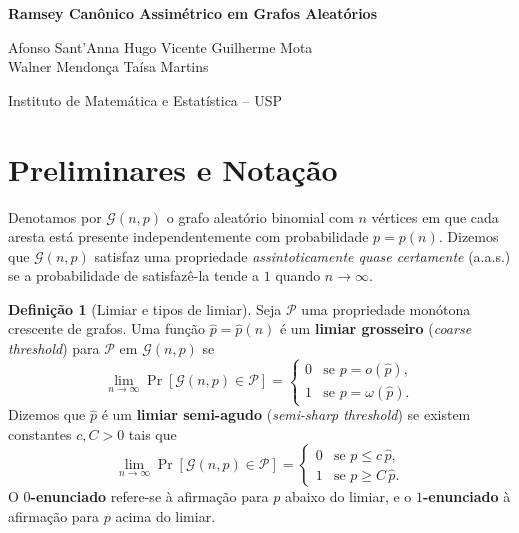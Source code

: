 \documentclass[reqno, 12pt]{amsart}
\date{\today}
\numberwithin{equation}{section}
\theoremstyle{plain}
\theoremstyle{definition}
\newtheorem{definition}[theorem]{Definição}
\newcommand{\Gnp}{\mathcal{G}(n,p)}
\newcommand{\whp}{a.a.s.}
\begin{document}

\begin{center}
  {\large\textbf{Ramsey Canônico Assimétrico em Grafos Aleatórios}}

  \vspace{0.4cm}

  Afonso Sant'Anna \quad Hugo Vicente \quad Guilherme Mota \\
  Walner Mendonça \quad Taísa Martins


    {\small Instituto de Matemática e Estatística -- USP}
\end{center}

\vspace{0.5cm}

\tableofcontents

\bigskip

\section{Preliminares e Notação}

Denotamos por $\Gnp$ o grafo aleatório binomial com $n$ vértices em que cada aresta
está presente independentemente com probabilidade $p = p(n)$.
Dizemos que $\Gnp$ satisfaz uma propriedade \emph{assintoticamente quase certamente}
(\whp) se a probabilidade de satisfazê-la tende a $1$ quando $n \to \infty$.

\begin{definition}[Limiar e tipos de limiar]
  Seja $\mathcal{P}$ uma propriedade monótona crescente de grafos.
  Uma função $\hat{p} = \hat{p}(n)$ é um \textbf{limiar grosseiro} (\emph{coarse threshold})
  para $\mathcal{P}$ em $\Gnp$ se
  \[
    \lim_{n\to\infty} \Pr[\Gnp \in \mathcal{P}] =
    \begin{cases}
      0 & \text{se } p = o(\hat{p}),      \\
      1 & \text{se } p = \omega(\hat{p}).
    \end{cases}
  \]
  Dizemos que $\hat{p}$ é um \textbf{limiar semi-agudo} (\emph{semi-sharp threshold})
  se existem constantes $c, C > 0$ tais que
  \[
    \lim_{n\to\infty} \Pr[\Gnp \in \mathcal{P}] =
    \begin{cases}
      0 & \text{se } p \le c\,\hat{p}, \\
      1 & \text{se } p \ge C\,\hat{p}.
    \end{cases}
  \]
  O \textbf{$0$-enunciado} refere-se à afirmação para $p$ abaixo do limiar,
  e o \textbf{$1$-enunciado} à afirmação para $p$ acima do limiar.
\end{definition}
\end{document}
